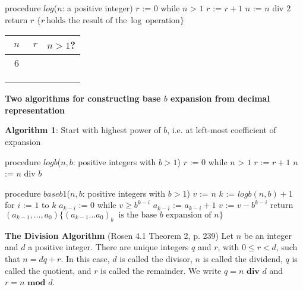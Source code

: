 \documentclass[12pt, oneside]{article}
\begin{document}


\begin{multicols}{2}
\begin{minipage}{4in}
\begin{algorithm}[caption={Algorithm for calculating integer part of $\log$}]
procedure $\textit{log}$($n$: a positive integer)
$r$ := $0$
while $n$ > $1$
  $r$ := $r + 1$
  $n$ := $n$ div $2$
return $r$ $\{ r~\textrm{holds the result of the}~\log~\textrm{operation}\} $
\end{algorithm}
\end{minipage}
\begin{center}
\begin{tabular}{c|c|c}
$n$ & $r$  & $n > 1$?\\
\hline 
~$6$~ & \phantom{~$0$~} & \phantom{~T~}\\
\phantom{$3$} & \phantom{$1$} & \phantom{T}\\
\phantom{$1$} & \phantom{$2$} & \phantom{F}\\
&\\
\end{tabular}
\end{center}
\end{multicols}

{\bf Two algorithms for constructing base $b$ expansion from decimal representation}

{\bf Algorithm 1}: Start with highest power of $b$, i.e. at left-most coefficient of expansion
\begin{multicols}{2}
\begin{algorithm}[caption={Calculating integer part of $\log_b$}]
procedure $\textit{logb}$($n, b$: positive integers with $b > 1$)
$r$ := $0$
while $n$ > $1$
  $r$ := $r + 1$
  $n$ := $n$ div $b$
\end{algorithm}
\columnbreak
\begin{algorithm}[caption={Calculating base $b$ expansion, from left}]
procedure $\textit{baseb1}$($n, b$: positive integers with $b > 1$)
$v$ := $n$
$k$ := $logb(n,b) + 1$
for $i$ := $1$ to $k$
  $a_{k-i}$ := $0$
  while $v \geq b^{k-i}$
    $a_{k-i}$ := $a_{k-i} + 1$
    $v$ := $v -  b^{k-i}$
return $(a_{k-1}, \ldots, a_0) \{(a_{k-1} \ldots a_0)_b~\textrm{ is the base } b \textrm{ expansion of } n \}$
\end{algorithm}
\end{multicols}


 {\bf The Division Algorithm} (Rosen 4.1 Theorem 2, p. 239) Let $n$ be an integer 
and $d$ a positive integer. There are unique integers $q$ and $r$, with $0 \leq r < d$, such that 
$n = dq + r$. In this case, $d$ is called the divisor, $n$ is called the dividend, $q$ is called the quotient, 
and $r$ is called the remainder. We write $q=n \textbf{ div } d$ and $r=n \textbf{ mod } d$.
\end{document}
